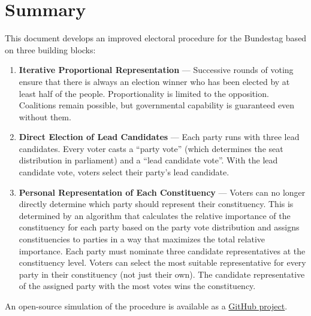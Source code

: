 \section*{Summary}

This document develops an improved electoral procedure for the Bundestag based on three building blocks:

\begin{enumerate}
  \item \textbf{Iterative Proportional Representation} --- Successive rounds of voting ensure
    that there is always an election winner who has been elected by at least half of the people.
    Proportionality is limited to the opposition. Coalitions remain possible,
    but governmental capability is guaranteed even without them.

  \item \textbf{Direct Election of Lead Candidates} --- Each party runs with three
    lead candidates. Every voter casts a \enquote{party vote} (which determines the
    seat distribution in parliament) and a \enquote{lead candidate vote}. With the
    lead candidate vote, voters select their party's lead candidate.

  \item \textbf{Personal Representation of Each Constituency} --- Voters can no longer directly
    determine which party should represent their constituency. This is determined by an algorithm
    that calculates the relative importance of the constituency for each party based on the party vote
    distribution and assigns constituencies to parties in a way that maximizes the total relative
    importance.
    Each party must nominate three candidate representatives at the constituency level. Voters
    can select the most suitable representative for every party in their constituency (not just their own).
    The candidate representative of the assigned party with the most votes wins the constituency.
\end{enumerate}

An open-source simulation of the procedure is available as a
\href{https://github.com/danielschwalbe/ipres}{GitHub project}.
